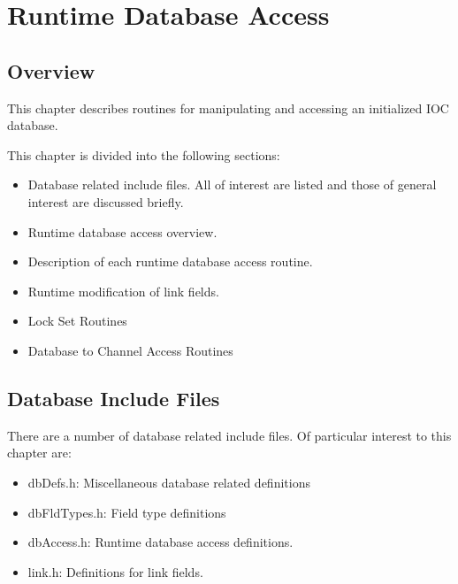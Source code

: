 \chapter{Runtime Database Access}

\section{Overview}

This chapter describes routines for manipulating and accessing an initialized IOC database.

This chapter is divided into the following sections:

\begin{itemize}
\item Database related include files.
All of interest are listed and those of general interest are discussed briefly.

\item Runtime database access overview.

\item Description of each runtime database access routine.

\item Runtime modification of link fields.

\item Lock Set Routines

\item Database to Channel Access Routines

\end{itemize}

\section{Database Include Files}

There are a number of database related include files.
Of particular interest to this chapter are:

\begin{itemize}
\item {}dbDefs.h: Miscellaneous database related definitions

\item {}dbFldTypes.h: Field type definitions

\item {}dbAccess.h: Runtime database access definitions.

\item {}link.h: Definitions for link fields.

\end{itemize}

